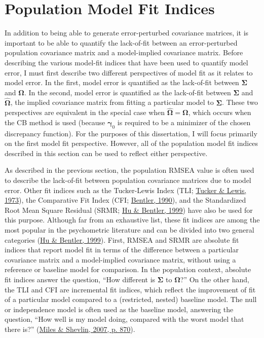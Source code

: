 \documentclass[11pt]{umnthesis}
\begin{document}
\hypertarget{population-model-fit-indices}{%
\section{Population Model Fit Indices}\label{population-model-fit-indices}}

In addition to being able to generate error-perturbed covariance matrices, it is important to be able to quantify the lack-of-fit between an error-perturbed population covariance matrix and a model-implied covariance matrix. Before describing the various model-fit indices that have been used to quantify model error, I must first describe two different perspectives of model fit as it relates to model error. In the first, model error is quantified as the lack-of-fit between \(\bm{\Sigma}\) and \(\bm{\Omega}\). In the second, model error is quantified as the lack-of-fit between \(\bm{\Sigma}\) and \(\hat{\bm{\Omega}}\), the implied covariance matrix from fitting a particular model to \(\bm{\Sigma}\). These two perspectives are equivalent in the special case when \(\hat{\bm{\Omega}} = \bm{\Omega}\), which occurs when the CB method is used (because \(\bm{\gamma}_0\) is required to be a minimizer of the chosen discrepancy function). For the purposes of this dissertation, I will focus primarily on the first model fit perspective. However, all of the population model fit indices described in this section can be used to reflect either perspective.

As described in the previous section, the population RMSEA value is often used to describe the lack-of-fit between population covariance matrices due to model error. Other fit indices such as the Tucker-Lewis Index (TLI; \protect\hyperlink{ref-tucker1973}{Tucker \& Lewis, 1973}), the Comparative Fit Index (CFI; \protect\hyperlink{ref-bentler1990}{Bentler, 1990}), and the Standardized Root Mean Square Residual (SRMR; \protect\hyperlink{ref-hu1999}{Hu \& Bentler, 1999}) have also be used for this purpose. Although far from an exhaustive list, these fit indices are among the most popular in the psychometric literature and can be divided into two general categories (\protect\hyperlink{ref-hu1999}{Hu \& Bentler, 1999}). First, RMSEA and SRMR are absolute fit indices that report model fit in terms of the difference between a particular covariance matrix and a model-implied covariance matrix, without using a reference or baseline model for comparison. In the population context, absolute fit indices answer the question, ``How different is \(\bm{\Sigma}\) to \(\bm{\Omega}\)?'' On the other hand, the TLI and CFI are incremental fit indices, which reflect the improvement of fit of a particular model compared to a (restricted, nested) baseline model. The null or independence model is often used as the baseline model, answering the question, ``How well is my model doing, compared with the worst model that there is?'' (\protect\hyperlink{ref-miles2007}{Miles \& Shevlin, 2007, p. 870}).
\end{document}
